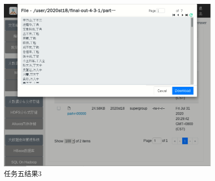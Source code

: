 \documentclass[a4paper,UTF8]{article}
\numberwithin{equation}{section}
\begin{document}
\begin{figure}[H]
    \centering
    \includegraphics[width = 15cm]{task5-3-output.png}
    \caption{任务五结果3}
\end{figure}




\end{document}
